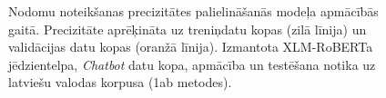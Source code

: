 \begin{figure}[h] 
   \centering
   \caption{Nodomu noteikšanas precizitātes palielināšanās modeļa apmācībās gaitā. Precizitāte aprēķināta uz treniņdatu kopas (zilā līnija) un validācijas datu kopas (oranžā līnija). Izmantota XLM-RoBERTa jēdzientelpa, \textit{Chatbot} datu kopa, apmācība un testēšana notika uz latviešu valodas korpusa (1ab metodes).} 
   \label{fig:chatbot-xlm}
\end{figure}


